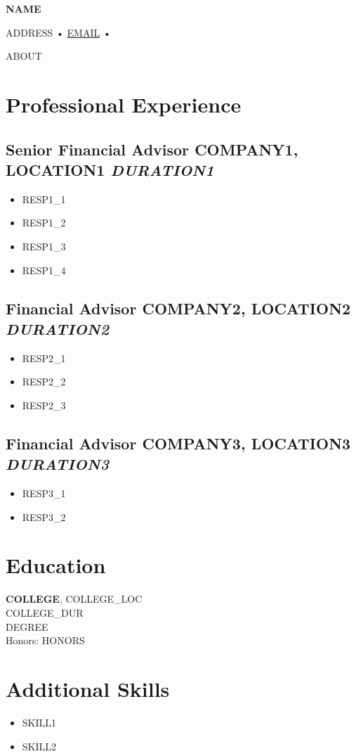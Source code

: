 \documentclass[11pt,a4paper]{article}
\begin{document}
{\huge\bfseries\color{headingcolor} {{{NAME}}}}

\vspace{0.3em}
{\small
{{ADDRESS}} \quad • \quad \href{mailto:{{EMAIL}}}{{{EMAIL}}} \quad • 
}

\vspace{0.3em}
\noindent{\color{headingcolor}\rule{\linewidth}{0.4pt}}

{\small {{{ABOUT}}}}

\section{Professional Experience}

\subsection{Senior Financial Advisor \hfill \normalsize {{{COMPANY1}}}, {{{LOCATION1}}} \hfill \textit{{{DURATION1}}}}

\begin{itemize}
    \item {{RESP1_1}}
    \item {{RESP1_2}}
    \item {{RESP1_3}}
    \item {{RESP1_4}}
\end{itemize}

\subsection{Financial Advisor \hfill \normalsize {{COMPANY2}}, {{LOCATION2}} \hfill \textit{{{DURATION2}}}}

\begin{itemize}
    \item {{{RESP2_1}}}
    \item {{{RESP2_2}}}
    \item {{{RESP2_3}}}
\end{itemize}

\subsection{Financial Advisor \hfill \normalsize {{{COMPANY3}}}, {{{LOCATION3}}} \hfill \textit{{{DURATION3}}}}

\begin{itemize}
    \item {{{RESP3_1}}}
    \item {{{RESP3_2}}}
\end{itemize}

\section{{{Education}}}

\textbf{{{COLLEGE}}}, {{{COLLEGE_LOC}}}\\
{{{COLLEGE_DUR}}}\\
{{{DEGREE}}}\\
Honors: {{{HONORS}}}

\section{{{Additional Skills}}}

\begin{itemize}
    \item {{{{SKILL1}}}}
    \item {{{{SKILL2}}}}
\end{itemize}
\end{document}
